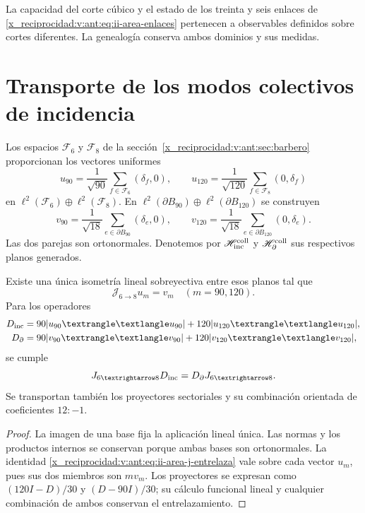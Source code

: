 La capacidad del corte cúbico y el estado de los treinta y seis enlaces
de \eqref{x_reciprocidad:v:ant:eq:ii-area-enlaces} pertenecen a observables definidos sobre
cortes diferentes. La genealogía conserva ambos dominios y sus medidas.

\section{Transporte de los modos colectivos de incidencia}
\label{x_reciprocidad:v:ant:sec:ii-area-transporte-colectivo}

Los espacios \(\mathcal F_6\) y \(\mathcal F_8\) de la
sección~\ref{x_reciprocidad:v:ant:sec:barbero} proporcionan los vectores uniformes
\[
 u_{90}=\frac1{\sqrt{90}}\sum_{f\in\mathcal F_6}(\delta_f,0),
 \qquad
 u_{120}=\frac1{\sqrt{120}}\sum_{f\in\mathcal F_8}(0,\delta_f)
\]
en \(\ell^2(\mathcal F_6)\oplus\ell^2(\mathcal F_8)\).
En \(\ell^2(\partial B_{90})\oplus\ell^2(\partial B_{120})\)
se construyen
\[
 v_{90}=\frac1{\sqrt{18}}\sum_{e\in\partial B_{90}}(\delta_e,0),
 \qquad
 v_{120}=\frac1{\sqrt{18}}\sum_{e\in\partial B_{120}}(0,\delta_e).
\]
Las dos parejas son ortonormales. Denotemos por
\(\mathscr H_{\rm inc}^{\rm coll}\) y
\(\mathscr H_\partial^{\rm coll}\) sus respectivos planos generados.

\begin{theorem}
\label{x_reciprocidad:v:ant:thm:ii-area-entrelazamiento-colectivo}
Existe una única isometría lineal sobreyectiva entre esos planos tal que
\begin{equation}
 \mathcal J_{6\to8}u_m=v_m\quad(m=90,120).
 \label{x_reciprocidad:v:ant:eq:ii-area-j-colectivo}
\end{equation}
Para los operadores
\[
 \begin{aligned}
 D_{\rm inc}&=90|u_{90}\rangle\langle u_{90}|
             +120|u_{120}\rangle\langle u_{120}|,\\
 D_\partial&=90|v_{90}\rangle\langle v_{90}|
             +120|v_{120}\rangle\langle v_{120}|,
 \end{aligned}
\]
se cumple
\begin{equation}
 \mathcal J_{6\to8}D_{\rm inc}
 =D_\partial\mathcal J_{6\to8}.
 \label{x_reciprocidad:v:ant:eq:ii-area-j-entrelaza}
\end{equation}
Se transportan también los proyectores sectoriales y su combinación
orientada de coeficientes \(12:-1\).
\end{theorem}
\begin{proof}
La imagen de una base fija la aplicación lineal única. Las normas y los
productos internos se conservan porque ambas bases son ortonormales.
La identidad \eqref{x_reciprocidad:v:ant:eq:ii-area-j-entrelaza} vale sobre cada vector
\(u_m\), pues sus dos miembros son \(m v_m\). Los proyectores se
expresan como \((120I-D)/30\) y \((D-90I)/30\); su cálculo funcional
lineal y cualquier combinación de ambos conservan el entrelazamiento.
\end{proof}

